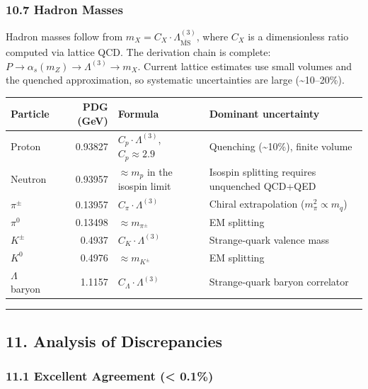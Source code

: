 \subsubsection{10.7 Hadron Masses}\label{107-hadron-masses}

Hadron masses follow from \(m_X = C_X \cdot \Lambda_{\overline{\text{MS}}}^{(3)}\), where \(C_X\) is a dimensionless ratio computed via lattice QCD. The derivation chain is complete: \(P \to \alpha_s(m_Z) \to \Lambda^{(3)} \to m_X\). Current lattice estimates use small volumes and the quenched approximation, so systematic uncertainties are large (\textasciitilde10--20\%).

{\def\LTcaptype{none} %
\begin{longtable}[]{@{}lrll@{}}
\toprule\noalign{}
Particle & PDG (GeV) & Formula & Dominant uncertainty \\
\midrule\noalign{}
\endhead
\bottomrule\noalign{}
\endlastfoot
Proton & 0.93827 & \(C_p \cdot \Lambda^{(3)}\), \(C_p \approx 2.9\) & Quenching (\textasciitilde10\%), finite volume \\
Neutron & 0.93957 & \(\approx m_p\) in the isospin limit & Isospin splitting requires unquenched QCD+QED \\
\(\pi^\pm\) & 0.13957 & \(C_\pi \cdot \Lambda^{(3)}\) & Chiral extrapolation (\(m_\pi^2 \propto m_q\)) \\
\(\pi^0\) & 0.13498 & \(\approx m_{\pi^\pm}\) & EM splitting \\
\(K^\pm\) & 0.4937 & \(C_K \cdot \Lambda^{(3)}\) & Strange-quark valence mass \\
\(K^0\) & 0.4976 & \(\approx m_{K^\pm}\) & EM splitting \\
\(\Lambda\) baryon & 1.1157 & \(C_\Lambda \cdot \Lambda^{(3)}\) & Strange-quark baryon correlator \\
\end{longtable}
}

\begin{center}\rule{0.5\linewidth}{0.5pt}\end{center}

\subsection{11. Analysis of Discrepancies}\label{11-analysis-of-discrepancies}

\subsubsection{11.1 Excellent Agreement (\textless{} 0.1\%)}\label{111-excellent-agreement--01}


